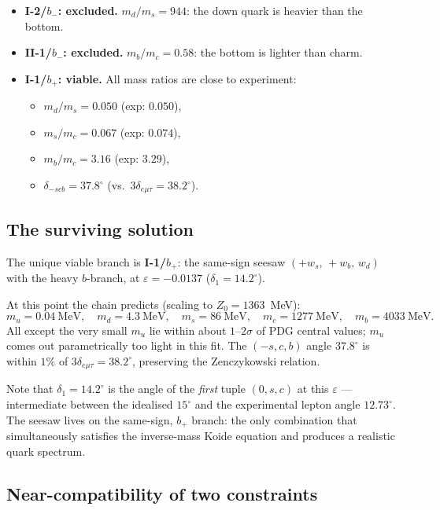 \documentclass[11pt]{article}
\begin{document}
\begin{itemize}
  \item \textbf{I-2/$b_-$: excluded.}  $m_d/m_s = 944$: the down quark
    is heavier than the bottom.
  \item \textbf{II-1/$b_-$: excluded.}  $m_b/m_c = 0.58$: the bottom
    is lighter than charm.
  \item \textbf{I-1/$b_+$: viable.}  All mass ratios are close to
    experiment:
    \begin{itemize}
      \item $m_d/m_s = 0.050$ (exp: $0.050$),
      \item $m_s/m_c = 0.067$ (exp: $0.074$),
      \item $m_b/m_c = 3.16$ (exp: $3.29$),
      \item $\delta_{-scb} = 37.8^\circ$ (vs.\ $3\delta_{e\mu\tau} = 38.2^\circ$).
    \end{itemize}
\end{itemize}

\subsection{The surviving solution}

The unique viable branch is \textbf{I-1/$b_+$}: the same-sign seesaw
$(+w_s,\,+w_b,\,w_d)$ with the heavy $b$-branch, at
$\varepsilon = -0.0137$ ($\delta_1 = 14.2^\circ$).

At this point the chain predicts (scaling to $Z_0 = 1363$~MeV):
\[
  m_u = 0.04~\text{MeV},\quad
  m_d = 4.3~\text{MeV},\quad
  m_s = 86~\text{MeV},\quad
  m_c = 1277~\text{MeV},\quad
  m_b = 4033~\text{MeV}.
\]
All except the very small $m_u$ lie within about $1$--$2\sigma$ of PDG
central values; $m_u$ comes out parametrically too light in this fit.
The $(-s,c,b)$ angle $37.8^\circ$ is within $1\%$ of
$3\delta_{e\mu\tau} = 38.2^\circ$, preserving the Zenczykowski
relation.

Note that $\delta_1 = 14.2^\circ$ is the angle of the \emph{first}
tuple $(0,s,c)$ at this $\varepsilon$ --- intermediate between the
idealised $15^\circ$ and the experimental lepton angle $12.73^\circ$.
The seesaw lives on the same-sign, $b_+$ branch: the only combination
that simultaneously satisfies the inverse-mass Koide equation and
produces a realistic quark spectrum.

\subsection{Near-compatibility of two constraints}
\end{document}
